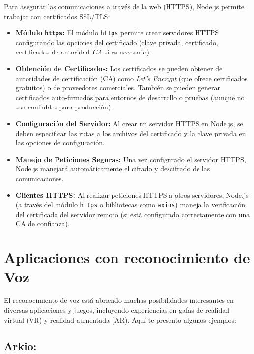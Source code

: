 \documentclass[a4paper, 12pt]{book}
\let\cleardoublepage\clearpage
\begin{document}
Para asegurar las comunicaciones a través de la web (HTTPS), Node.js permite trabajar con certificados SSL/TLS:

\begin{itemize}
  \item \textbf{Módulo \texttt{https}:} El módulo \texttt{https} permite crear servidores HTTPS configurando las opciones del certificado (clave privada, certificado, certificados de autoridad \textit{CA} si es necesario).

  \item \textbf{Obtención de Certificados:} Los certificados se pueden obtener de autoridades de certificación (CA) como \textit{Let's Encrypt} (que ofrece certificados gratuitos) o de proveedores comerciales. También se pueden generar certificados auto-firmados para entornos de desarrollo o pruebas (aunque no son confiables para producción).

  \item \textbf{Configuración del Servidor:} Al crear un servidor HTTPS en Node.js, se deben especificar las rutas a los archivos del certificado y la clave privada en las opciones de configuración.

  \item \textbf{Manejo de Peticiones Seguras:} Una vez configurado el servidor HTTPS, Node.js manejará automáticamente el cifrado y descifrado de las comunicaciones.

  \item \textbf{Clientes HTTPS:} Al realizar peticiones HTTPS a otros servidores, Node.js (a través del módulo \texttt{https} o bibliotecas como \texttt{axios}) maneja la verificación del certificado del servidor remoto (si está configurado correctamente con una CA de confianza).
\end{itemize}

\cleardoublepage
\section{Aplicaciones con reconocimiento de Voz} 
\label{sec:seccion10}
El reconocimiento de voz está abriendo muchas posibilidades interesantes en diversas aplicaciones y juegos, incluyendo experiencias en gafas de realidad virtual (VR) y realidad aumentada (AR). Aquí te presento algunos ejemplos:

\subsection{Arkio:}
\end{document}
